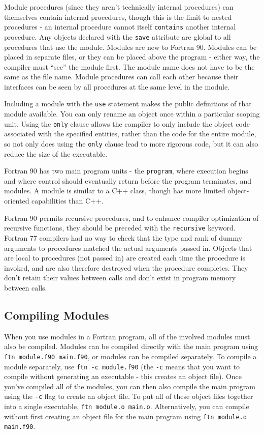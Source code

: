\documentclass[10pt]{article}
\begin{document}
Module procedures (since they aren't technically internal procedures) can themselves contain internal procedures, though this is the limit to nested procedures - an internal procedure cannot itself {\tt contains} another internal procedure. Any objects declared with the {\tt save} attribute are global to all procedures that use the module. Modules are new to Fortran 90. Modules can be placed in separate files, or they can be placed above the program - either way, the compiler must ``see'' the module first. The module name does not have to be the same as the file name. Module procedures can call each other because their interfaces can be seen by all procedures at the same level in the module. 

Including a module with the {\tt use} statement makes the public definitions of that module available. You can only rename an object once within a particular scoping unit. Using the {\tt only} clause allows the compiler to only include the object code associated with the specified entities, rather than the code for the entire module, so not only does using the {\tt only} clause lead to more rigorous code, but it can also reduce the size of the executable.

Fortran 90 has two main program units - the {\tt program}, where execution begins and where control should eventually return before the program terminates, and modules. A module is similar to a C++ class, though has more limited object-oriented capabilities than C++. 

Fortran 90 permits recursive procedures, and to enhance compiler optimization of recursive functions, they should be preceded with the {\tt recursive} keyword. Fortran 77 compilers had no way to check that the type and rank of dummy arguments to procedures matched the actual arguments passed in. Objects that are local to procedures (not passed in) are created each time the procedure is invoked, and are also therefore destroyed when the procedure completes. They don't retain their values between calls and don't exist in program memory between calls. 

\subsection{Compiling Modules}
When you use modules in a Fortran program, all of the involved modules must also be compiled. Modules can be compiled directly with the main program using {\tt ftn module.f90 main.f90}, or modules can be compiled separately. To compile a module separately, use {\tt ftn -c module.f90} (the {\tt -c} means that you want to compile without generating an executable - this creates an object file). Once you've compiled all of the modules, you can then also compile the main program using the {\tt -c} flag to create an object file. To put all of these object files together into a single executable, {\tt ftn module.o main.o}. Alternatively, you can compile without first creating an object file for the main program using {\tt ftn module.o main.f90}.
\end{document}
